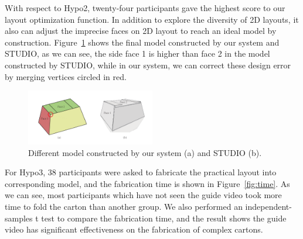 With respect to Hypo2, twenty-four participants gave the highest score to our layout optimization function. In addition to explore the diversity of 2D layouts, it also can adjust the imprecise faces on 2D layout to reach an ideal model by construction. Figure~\ref{fig:correction} shows the final model constructed by our system and STUDIO, as we can see, the side face 1 is higher than face 2 in the model constructed by STUDIO, while in our system, we can correct these design error by merging vertices circled in red.

\begin{figure}
	\centering
	\includegraphics[width=0.5\textwidth]{images/comparison}
	\caption{Different model constructed by our system (a) and STUDIO (b). }
	\label{fig:correction}
\end{figure}

For Hypo3, 38 participants were asked to fabricate the practical layout into corresponding model, and the fabrication time is shown in Figure~\ref{fig:time}. As we can see, most participants which have not seen the guide video took more time to fold the carton than another group. We also performed an independent-samples t test to compare the fabrication time, and the result shows the guide video has significant effectiveness on the fabrication of complex cartons.




